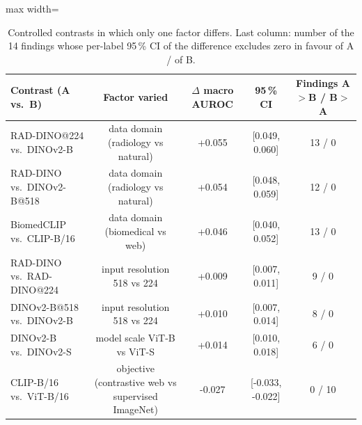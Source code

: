 \begin{table}[H]\centering
\scriptsize
\caption{Controlled contrasts in which only one factor differs. Last column: number of the 14 findings whose per-label 95\,\% CI of the difference excludes zero in favour of A / of B.}\label{tab:contrasts}
\begin{adjustbox}{max width=\linewidth}
\begin{tabular}{lcccc}
\toprule
Contrast (A vs.\ B) & Factor varied & $\Delta$ macro AUROC & 95\,\% CI & Findings A$>$B / B$>$A \\
\midrule
RAD-DINO@224 vs.\ DINOv2-B & data domain (radiology vs natural) & +0.055 & [0.049, 0.060] & 13 / 0 \\
RAD-DINO vs.\ DINOv2-B@518 & data domain (radiology vs natural) & +0.054 & [0.048, 0.059] & 12 / 0 \\
BiomedCLIP vs.\ CLIP-B/16 & data domain (biomedical vs web) & +0.046 & [0.040, 0.052] & 13 / 0 \\
RAD-DINO vs.\ RAD-DINO@224 & input resolution 518 vs 224 & +0.009 & [0.007, 0.011] & 9 / 0 \\
DINOv2-B@518 vs.\ DINOv2-B & input resolution 518 vs 224 & +0.010 & [0.007, 0.014] & 8 / 0 \\
DINOv2-B vs.\ DINOv2-S & model scale ViT-B vs ViT-S & +0.014 & [0.010, 0.018] & 6 / 0 \\
CLIP-B/16 vs.\ ViT-B/16 & objective (contrastive web vs supervised ImageNet) & -0.027 & [-0.033, -0.022] & 0 / 10 \\
\bottomrule
\end{tabular}
\end{adjustbox}
\end{table}
